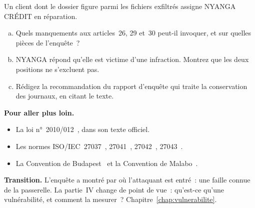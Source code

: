 \begin{boxexo}[title={\ding{45}\quad Exercice~8.4. Les obligations de la victime \niveauexpert}]
Un client dont le dossier figure parmi les fichiers exfiltrés assigne NYANGA
CRÉDIT en réparation.
\begin{enumerate}[(a)]
    \item Quels manquements aux articles~26, 29 et~30 peut-il invoquer, et
          sur quelles pièces de l'enquête~?
    \item NYANGA répond qu'elle est victime d'une infraction. Montrez que
          les deux positions ne s'excluent pas.
    \item Rédigez la recommandation du rapport d'enquête qui traite la
          conservation des journaux, en citant le texte.
\end{enumerate}
\end{boxexo}

\bigskip

\begin{boxinfo}
\textbf{Pour aller plus loin.}
\begin{itemize}
    \item La loi n°~2010/012~\cite{loi2010012}, dans son texte officiel.
    \item Les normes ISO/IEC~27037~\cite{iso27037_2012},
          27041~\cite{iso27041_2015}, 27042~\cite{iso27042_2015},
          27043~\cite{iso27043_2015}.
    \item La Convention de Budapest~\cite{budapest2001} et la Convention de
          Malabo~\cite{ua2014malabo}.
\end{itemize}
\end{boxinfo}

\begin{boxinfo}
\textbf{Transition.} L'enquête a montré par où l'attaquant est entré~: une
faille connue de la passerelle. La partie~IV change de point de vue~:
qu'est-ce qu'une vulnérabilité, et comment la mesurer~?
Chapitre~\ref{chap:vulnerabilite}.
\end{boxinfo}
